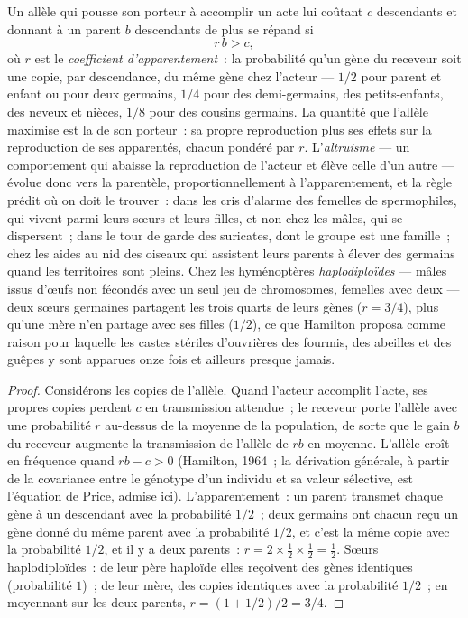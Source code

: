 \begin{theorem}\label{thm:b3:behavioural-ecology:hamilton}
Un allèle qui pousse son porteur à accomplir un acte lui coûtant $c$
descendants et donnant à un parent $b$ descendants de plus se répand si
\[
r\,b > c ,
\]
où $r$ est le \emph{coefficient d'apparentement}~: la probabilité qu'un
gène du receveur soit une copie, par descendance, du même gène chez
l'acteur --- $1/2$ pour parent et enfant ou pour deux germains, $1/4$
pour des demi-germains, des petits-enfants, des neveux et nièces, $1/8$
pour des cousins germains. La quantité que l'allèle maximise est la
\emph{} de son porteur~: sa propre
reproduction plus ses effets sur la reproduction de ses apparentés,
chacun pondéré par $r$. L'\emph{altruisme} --- un comportement qui
abaisse la reproduction de l'acteur et élève celle d'un autre ---
évolue donc vers la parentèle, proportionnellement à l'apparentement, et
la règle prédit où on doit le trouver~: dans les cris d'alarme des
femelles de spermophiles, qui vivent parmi leurs sœurs et leurs filles,
et non chez les mâles, qui se dispersent~; dans le tour de garde des
suricates, dont le groupe est une famille~; chez les aides au nid des
oiseaux qui assistent leurs parents à élever des germains quand les
territoires sont pleins. Chez les hyménoptères \emph{haplodiploïdes} ---
mâles issus d'œufs non fécondés avec un seul jeu de chromosomes,
femelles avec deux --- deux sœurs germaines partagent les trois quarts
de leurs gènes ($r = 3/4$), plus qu'une mère n'en partage avec ses
filles ($1/2$), ce que Hamilton proposa comme raison pour laquelle les
castes stériles d'ouvrières des fourmis, des abeilles et des guêpes y
sont apparues onze fois et ailleurs presque jamais.
\end{theorem}
\begin{proof}
Considérons les copies de l'allèle. Quand l'acteur accomplit l'acte, ses
propres copies perdent $c$ en transmission attendue~; le receveur porte
l'allèle avec une probabilité $r$ au-dessus de la moyenne de la
population, de sorte que le gain $b$ du receveur augmente la
transmission de l'allèle de $rb$ en moyenne. L'allèle croît en fréquence
quand $rb - c > 0$ (Hamilton, 1964~; la dérivation générale, à partir de
la covariance entre le génotype d'un individu et sa valeur sélective,
est l'équation de Price, admise ici). L'apparentement~: un parent
transmet chaque gène à un descendant avec la probabilité $1/2$~; deux
germains ont chacun reçu un gène donné du même parent avec la
probabilité $1/2$, et c'est la même copie avec la probabilité $1/2$, et
il y a deux parents~: $r = 2\times\tfrac{1}{2}
\times\tfrac{1}{2} = \tfrac{1}{2}$. Sœurs haplodiploïdes~: de leur père
haploïde elles reçoivent des gènes identiques (probabilité $1$)~; de leur
mère, des copies identiques avec la probabilité $1/2$~; en moyennant sur
les deux parents, $r = (1 + 1/2)/2 = 3/4$.
\end{proof}

